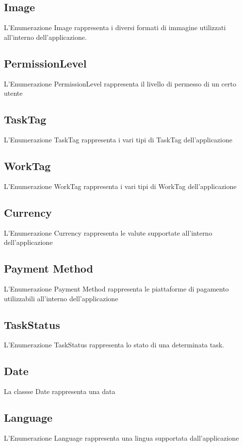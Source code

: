 \documentclass{report}
\begin{document}
\subsection*{Image}
L'Enumerazione Image rappresenta i diversi formati di immagine utilizzati all'interno dell'applicazione.
\subsection*{PermissionLevel}
L'Enumerazione PermissionLevel rappresenta il livello di permesso di un certo utente
\subsection*{TaskTag}
L'Enumerazione TaskTag rappresenta i vari tipi di TaskTag dell'applicazione
\subsection*{WorkTag}
L'Enumerazione WorkTag rappresenta i vari tipi di WorkTag dell'applicazione
\subsection*{Currency}
L'Enumerazione Currency rappresenta le valute supportate all'interno dell'applicazione
\subsection*{Payment Method}
L'Enumerazione Payment Method rappresenta le piattaforme di pagamento utilizzabili all'interno dell'applicazione 
\subsection*{TaskStatus}
L'Enumerazione TaskStatus rappresenta lo stato di una determinata task.
\subsection*{Date}
La classse Date rappresenta una data
\subsection*{Language}
L'Enumerazione Language rappresenta una lingua supportata dall'applicazione
\end{document}
